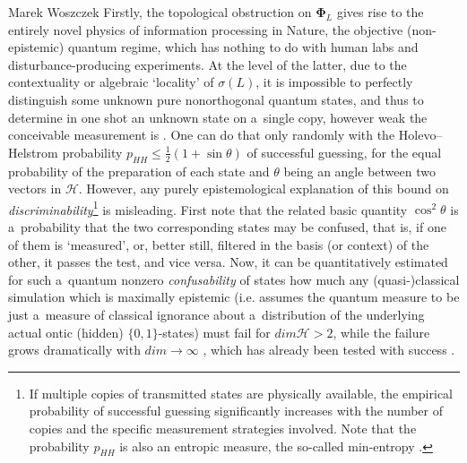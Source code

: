 \begin{artengenv}{Marek Woszczek}
Firstly, the topological obstruction on $\bm{\Phi}_L$ gives rise to the entirely novel physics of information processing in Nature, the objective (non-epistemic) quantum regime, which has nothing to do with human labs and disturbance-producing experiments. At the level of the latter, due to the contextuality or algebraic ‘locality' of $\sigma (L)$, it is impossible to perfectly distinguish some unknown pure nonorthogonal quantum states, and thus to determine in one shot an unknown state on a~single copy, however weak the conceivable measurement is
\parencite[][]{dariano_impossibility_1996}. %
 One can do that only randomly with the Holevo–Helstrom probability $p_{\mathit{HH}} \leq \frac{1}{2}(1+\sin \theta )$ of successful guessing, for the equal probability of the preparation of each state and $\theta $ being an angle between two vectors in $\mathcal{H}$. However, any purely epistemological explanation of this bound on \textit{discriminability}\footnote{If multiple copies of transmitted states are physically available, the empirical probability of successful guessing significantly increases with the number of copies and the specific measurement strategies involved. Note that the probability $p_{\mathit{HH}}$ is also an entropic measure, the so-called min-entropy 
\parencite[][]{konig_operational_2009}.%
 } is misleading. First note that the related basic quantity $\cos ^2\theta $ is a~probability that the two corresponding states may be confused, that is, if one of them is ‘measured', or, better still, filtered in the basis (or context) of the other, it passes the test, and vice versa. Now, it can be quantitatively estimated for such a~quantum nonzero \textit{confusability} of states how much any (quasi-)classical simulation which is maximally epistemic (i.e. assumes the quantum measure to be just a~measure of classical ignorance about a~distribution of the underlying actual ontic (hidden) $\{0,1\}$-states) must fail for $\mathit{dim} \mathcal{H} > 2$, while the failure grows dramatically with $\mathit{dim}\rightarrow {\infty}$ 
\parencites[][]{leifer_ensuremathpsi-epistemic_2014}[][]{leifer_ensuremathpsi-epistemic_2014}[][]{leifer_ensuremathpsi-epistemic_2014}, %
 which has already been tested with success 
\parencites[e.g.][]{ringbauer_measurements_2015}[][]{ringbauer_measurements_2015}.%

\end{artengenv}

